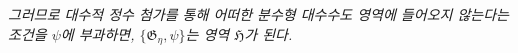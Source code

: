 
\emph{그러므로 대수적 정수 첨가를 통해 어떠한 분수형 대수수도 영역에 들어오지 않는다는 조건을 $\psi$에 부과하면, $\{\mathfrak G_\eta,\psi\}$는 영역 $\mathfrak H$가 된다.}

